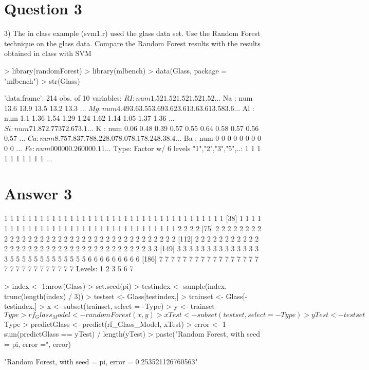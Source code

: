 \documentclass{article}
\begin{document}
\section*{Question 3}

3) The in class example (svm1.r) used the glass data set. Use the Random
Forest technique on the glass data. Compare the Random Forest results with
the results obtained in class with SVM

\begin{Schunk}
\begin{Sinput}
> library(randomForest)
> library(mlbench)
> data(Glass, package = "mlbench")
> str(Glass)
\end{Sinput}
\begin{Soutput}
'data.frame':	214 obs. of  10 variables:
 $ RI  : num  1.52 1.52 1.52 1.52 1.52 ...
 $ Na  : num  13.6 13.9 13.5 13.2 13.3 ...
 $ Mg  : num  4.49 3.6 3.55 3.69 3.62 3.61 3.6 3.61 3.58 3.6 ...
 $ Al  : num  1.1 1.36 1.54 1.29 1.24 1.62 1.14 1.05 1.37 1.36 ...
 $ Si  : num  71.8 72.7 73 72.6 73.1 ...
 $ K   : num  0.06 0.48 0.39 0.57 0.55 0.64 0.58 0.57 0.56 0.57 ...
 $ Ca  : num  8.75 7.83 7.78 8.22 8.07 8.07 8.17 8.24 8.3 8.4 ...
 $ Ba  : num  0 0 0 0 0 0 0 0 0 0 ...
 $ Fe  : num  0 0 0 0 0 0.26 0 0 0 0.11 ...
 $ Type: Factor w/ 6 levels "1","2","3","5",..: 1 1 1 1 1 1 1 1 1 1 ...
\end{Soutput}
\end{Schunk}

\section*{Answer  3}

\begin{Schunk}
\begin{Soutput}
  [1] 1 1 1 1 1 1 1 1 1 1 1 1 1 1 1 1 1 1 1 1 1 1 1 1 1 1 1 1 1 1 1 1 1 1 1 1 1
 [38] 1 1 1 1 1 1 1 1 1 1 1 1 1 1 1 1 1 1 1 1 1 1 1 1 1 1 1 1 1 1 1 1 1 2 2 2 2
 [75] 2 2 2 2 2 2 2 2 2 2 2 2 2 2 2 2 2 2 2 2 2 2 2 2 2 2 2 2 2 2 2 2 2 2 2 2 2
[112] 2 2 2 2 2 2 2 2 2 2 2 2 2 2 2 2 2 2 2 2 2 2 2 2 2 2 2 2 2 2 2 2 2 2 2 3 3
[149] 3 3 3 3 3 3 3 3 3 3 3 3 3 3 3 5 5 5 5 5 5 5 5 5 5 5 5 5 6 6 6 6 6 6 6 6 6
[186] 7 7 7 7 7 7 7 7 7 7 7 7 7 7 7 7 7 7 7 7 7 7 7 7 7 7 7 7 7
Levels: 1 2 3 5 6 7
\end{Soutput}
\begin{Sinput}
> index <- 1:nrow(Glass)
> set.seed(pi)
> testindex <- sample(index, trunc(length(index) / 3))
> testset <- Glass[testindex,]
> trainset <- Glass[-testindex,]
> x <- subset(trainset, select = -Type)
> y <- trainset$Type
> rf_Glass_Model <- randomForest(x, y)
> xTest <- subset(testset, select = -Type)
> yTest <- testset$Type
> predictGlass <- predict(rf_Glass_Model, xTest)
> error <- 1 - sum(predictGlass == yTest) / length(yTest)
> paste("Random Forest, with seed = pi, error =", error)
\end{Sinput}
\begin{Soutput}
[1] "Random Forest, with seed = pi, error = 0.253521126760563"
\end{Soutput}
\end{Schunk}
\end{document}
